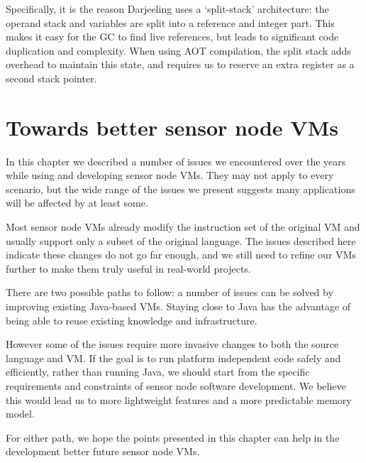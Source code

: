 Specifically, it is the reason Darjeeling uses a `split-stack' architecture: the operand stack and variables are split into a reference and integer part. This makes it easy for the GC to find live references, but leads to significant code duplication and complexity. When using AOT compilation, the split stack adds overhead to maintain this state, and requires us to reserve an extra register as a second stack pointer.




\section{Towards better sensor node VMs}
In this chapter we described a number of issues we encountered over the years while using and developing sensor node VMs. They may not apply to every scenario, but the wide range of the issues we present suggests many applications will be affected by at least some.

Most sensor node VMs already modify the instruction set of the original VM and usually support only a subset of the original language. The issues described here indicate these changes do not go far enough, and we still need to refine our VMs further to make them truly useful in real-world projects.

There are two possible paths to follow: a number of issues can be solved by improving existing Java-based VMs. Staying close to Java has the advantage of being able to reuse existing knowledge and infrastructure.

However some of the issues require more invasive changes to both the source language and VM. If the goal is to run platform independent code safely and efficiently, rather than running Java, we should start from the specific requirements and constraints of sensor node software development. We believe this would lead us to more lightweight features and a more predictable memory model.

For either path, we hope the points presented in this chapter can help in the development better future sensor node VMs.
